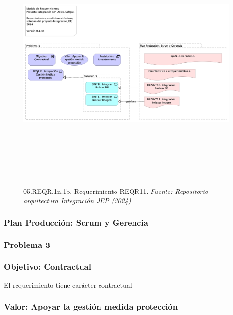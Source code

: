 \documentclass[
  paper=a4,
  ,captions=tableheading
]{scrartcl}
\begin{document}
\begin{figure}
\centering
\includegraphics[width=\textwidth,height=5.20833in]{images/05.REQR.1n.1b.RequerimientoREQR11.png}
\caption{05.REQR.1n.1b. Requerimiento REQR11. \emph{Fuente: Repositorio
arquitectura Integración JEP
(2024)}}\label{fig:id-8b4c8be23da34d399e8127a08a5204b8}
\end{figure}

\subsubsection{Plan Producción: Scrum y
Gerencia}\label{sec:plan-producciuxf3n-scrum-y-gerencia}

\subsubsection{Problema 3}\label{sec:problema-3}

\subsubsection{Objetivo: Contractual}\label{sec:objetivo-contractual}

El requerimiento tiene carácter contractual.

\subsubsection{Valor: Apoyar la gestión medida
protección}\label{sec:valor-apoyar-la-gestiuxf3n-medida-protecciuxf3n}
\end{document}
